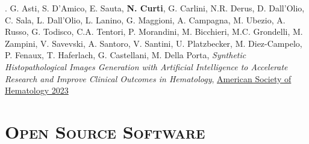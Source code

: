 \documentclass[a4paper,11pt]{article}
\newcounter{itemnumber}
\newenvironment{paperlist}{%
  \setcounter{itemnumber}{0}%
  \begin{list}{}{}%
}{\end{list}}
\newcommand{\enumicon}[2]{%
\stepcounter{itemnumber}%
\item[{\texttt{[image: \#2]}}] \theitemnumber.
}
\newcommand{\journal}[1]{\underline{#1}}
\newcommand{\paperTitle}[1]{\emph{#1}}
\begin{document}
\begin{paperlist}
  \enumicon{0.05}{abstract.png} G. Asti, S. D'Amico, E. Sauta, \textbf{N. Curti}, G. Carlini, N.R. Derus, D. Dall'Olio, C. Sala, L. Dall'Olio, L. Lanino, G. Maggioni, A. Campagna, M. Ubezio, A. Russo, G. Todisco, C.A. Tentori, P. Morandini, M. Bicchieri, M.C. Grondelli, M. Zampini, V. Savevski, A. Santoro, V. Santini, U. Platzbecker, M. Diez-Campelo, P. Fenaux, T. Haferlach, G. Castellani, M. Della Porta, \paperTitle{Synthetic Histopathological Images Generation with Artificial Intelligence to Accelerate Research and Improve Clinical Outcomes in Hematology}, \journal{American Society of Hematology 2023}

\end{paperlist}


\vspace*{0.5cm}
\section*{\scshape{Open Source Software}}
\end{document}
